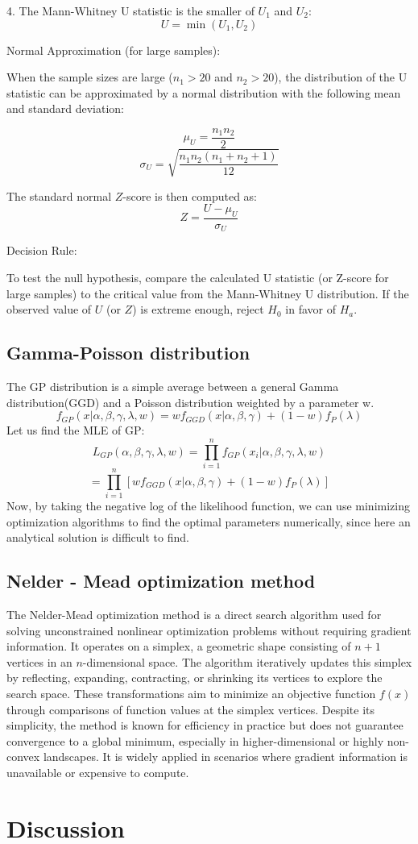 \documentclass[conference]{IEEEtran}
\begin{document}
4. The Mann-Whitney U statistic is the smaller of \( U_1 \) and \( U_2 \):
\[
U = \min(U_1, U_2)
\]

Normal Approximation (for large samples):

When the sample sizes are large (\(n_1 > 20\) and \(n_2 > 20\)), the distribution of the U statistic can be approximated by a normal distribution with the following mean and standard deviation:

\[
\mu_U = \frac{n_1 n_2}{2}
\]
\[
\sigma_U = \sqrt{\frac{n_1 n_2 (n_1 + n_2 + 1)}{12}}
\]

The standard normal \( Z \)-score is then computed as:
\[
Z = \frac{U - \mu_U}{\sigma_U}
\]

Decision Rule:

To test the null hypothesis, compare the calculated U statistic (or Z-score for large samples) to the critical value from the Mann-Whitney U distribution. If the observed value of \( U \) (or \( Z \)) is extreme enough, reject \( H_0 \) in favor of \( H_a \).

\subsection{Gamma-Poisson distribution}
The GP distribution is a simple average between a general Gamma distribution(GGD) and a Poisson distribution weighted by a parameter w.
\[f_{GP}(x|\alpha, \beta, \gamma, \lambda, w) = wf_{GGD}(x|\alpha, \beta, \gamma) + (1-w)f_P(\lambda)\]
Let us find the MLE of GP:
\[L_{GP}(\alpha, \beta, \gamma, \lambda, w) = \prod_{i=1}^n f_{GP}(x_i|\alpha, \beta, \gamma, \lambda, w)\]
\[= \prod_{i=1}^n [wf_{GGD}(x|\alpha, \beta, \gamma) + (1-w)f_P(\lambda)]\]
Now, by taking the negative log of the likelihood function, we can use minimizing optimization algorithms to find the optimal parameters numerically, since here an analytical solution is difficult to find.

\subsection{Nelder - Mead optimization method}
The Nelder-Mead optimization method is a direct search algorithm used for solving unconstrained nonlinear optimization problems without requiring gradient information. It operates on a simplex, a geometric shape consisting of $n+1$ vertices in an $n$-dimensional space. The algorithm iteratively updates this simplex by reflecting, expanding, contracting, or shrinking its vertices to explore the search space. These transformations aim to minimize an objective function $f(x)$ through comparisons of function values at the simplex vertices. Despite its simplicity, the method is known for efficiency in practice but does not guarantee convergence to a global minimum, especially in higher-dimensional or highly non-convex landscapes. It is widely applied in scenarios where gradient information is unavailable or expensive to compute.


\section{Discussion}

\newpage


\end{document}

